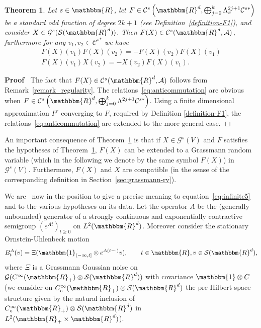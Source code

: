 \documentclass[11pt]{article}
\newcommand{\asterisk}{\mathord{*}}
\newenvironment{proof}{\noindent\textbf{Proof\ }}{\hspace*{\fill}$\Box$\medskip}
\newtheorem{theorem}{Theorem}
\begin{document}
\begin{theorem}
  \label{theorem_F}Let $s \in \mathbbm{R}$, let $F \in \mathcal{C}^s \left(
  \mathbbm{R}^d, \bigoplus_{j = 0}^k \Lambda^{2 j + 1}_{\pi} \mathcal{C}^{s
  \asterisk} \right)$ be a standard odd function of degree $2 k + 1$ (see
  Definition~\ref{definition-F1}), and consider $X \in \mathcal{G}^s
  (\mathcal{S} (\mathbbm{R}^d))$. Then $F (X) \in \mathcal{C}^s (\mathbbm{R}^d,
  \mathcal{A})$, furthermore for any $v_1, v_2 \in \mathcal{C}^{s \asterisk}$
  we have
  \begin{equation}
    \begin{array}{c}
      F (X) (v_1) F (X) (v_2) = - F (X) (v_2) F (X) (v_1)\\
      F (X) (v_1) X (v_2) = - X (v_2) F (X) (v_1) .
    \end{array} \label{eq:anticommutation}
  \end{equation}
\end{theorem}

\begin{proof}
  The fact that $F (X) \in \mathcal{C}^s (\mathbbm{R}^d, \mathcal{A})$ follows
  from Remark~\ref{remark_regularity}. The
  relations~{\eqref{eq:anticommutation}} are obvious when $F \in \mathcal{C}^s
  \left( \mathbbm{R}^d, \bigoplus_{j = 0}^k \Lambda^{2 j + 1} \mathcal{C}^{s
  \asterisk} \right)$. Using a finite dimensional approximation $F^r$
  converging to $F$, required by Definition \ref{definition-F1}, the
  relations~{\eqref{eq:anticommutation}} are extended to the more general
  case.
\end{proof}

\begin{remark}
  An important consequence of Theorem~\ref{theorem_F} is that if $X \in
  \mathcal{G}^s (V)$ and $F$ satisfies the hypotheses of
  Theorem~\ref{theorem_F}, $F (X)$ can be extended to a Grassmann random
  variable (which in the following we denote by the same symbol $F (X)$) in
  $\mathcal{G}^s (V)$. Furthermore, $F (X)$ and $X$ are compatible (in the
  sense of the corresponding definition in Section~\ref{sec:grassmann-rv}).
\end{remark}

We are \ now in the position to give a precise meaning to
equation~{\eqref{eq:infinite5}} and to the various hypotheses on its data. Let
the operator $A$ be the (generally unbounded) generator of a strongly
continuous and exponentially contractive semigroup $(e^{A t})_{t \geqslant 0}$
on $L^2 (\mathbbm{R}^d)$. Moreover consider the stationary Ornstein-Uhlenbeck
motion
\begin{equation}
  B^A_t (v) = \Xi (\mathbbm{1}_{(- \infty, t]} \otimes e^{A (t - \cdot)} v),
  \qquad t \in \mathbbm{R}, v \in \mathcal{S} (\mathbbm{R}^d), \label{eq:ba}
\end{equation}
where $\Xi$ is a Grassmann Gaussian noise on $\mathcal{G} (C^{\infty}
(\mathbbm{R}_+) \otimes \mathcal{S} (\mathbbm{R}^d))$ with covariance
$\mathbbm{1} \otimes C$ (we consider on $C^{\infty}_c (\mathbbm{R}_+) \otimes
\mathcal{S} (\mathbbm{R}^d)$ the pre-Hilbert space structure given by the
natural inclusion of $C^{\infty}_c (\mathbbm{R}_+) \otimes \mathcal{S}
(\mathbbm{R}^d)$ in $L^2 (\mathbbm{R}_+ \times \mathbbm{R}^d)$).
\end{document}
